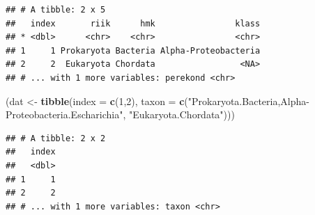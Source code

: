 \documentclass[]{book}
\newenvironment{Shaded}{\begin{snugshade}}{\end{snugshade}}
\newcommand{\KeywordTok}[1]{\textcolor[rgb]{0.13,0.29,0.53}{\textbf{#1}}}
\newcommand{\DataTypeTok}[1]{\textcolor[rgb]{0.13,0.29,0.53}{#1}}
\newcommand{\DecValTok}[1]{\textcolor[rgb]{0.00,0.00,0.81}{#1}}
\newcommand{\CharTok}[1]{\textcolor[rgb]{0.31,0.60,0.02}{#1}}
\newcommand{\StringTok}[1]{\textcolor[rgb]{0.31,0.60,0.02}{#1}}
\newcommand{\OperatorTok}[1]{\textcolor[rgb]{0.81,0.36,0.00}{\textbf{#1}}}
\newcommand{\NormalTok}[1]{#1}
\begin{document}
\begin{Shaded}
\end{Shaded}

\begin{verbatim}
## # A tibble: 2 x 5
##   index       riik      hmk                klass
## * <dbl>      <chr>    <chr>                <chr>
## 1     1 Prokaryota Bacteria Alpha-Proteobacteria
## 2     2  Eukaryota Chordata                 <NA>
## # ... with 1 more variables: perekond <chr>
\end{verbatim}

\begin{Shaded}
\begin{Highlighting}[]
\NormalTok{(dat <-}\StringTok{ }\KeywordTok{tibble}\NormalTok{(}\DataTypeTok{index =} \KeywordTok{c}\NormalTok{(}\DecValTok{1}\NormalTok{,}\DecValTok{2}\NormalTok{), }
               \DataTypeTok{taxon =} \KeywordTok{c}\NormalTok{(}\StringTok{"Prokaryota.Bacteria,Alpha-Proteobacteria.Escharichia"}\NormalTok{, }\StringTok{"Eukaryota.Chordata"}\NormalTok{)))}
\end{Highlighting}
\end{Shaded}

\begin{verbatim}
## # A tibble: 2 x 2
##   index
##   <dbl>
## 1     1
## 2     2
## # ... with 1 more variables: taxon <chr>
\end{verbatim}

\begin{Shaded}
\end{Shaded}
\end{document}
